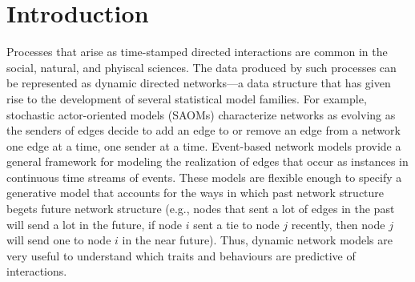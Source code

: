 \documentclass[ba]{imsart}
\numberwithin{equation}{section}
\theoremstyle{plain}
\begin{document}
\section{Introduction}\label{sec:introduction}

Processes that arise as time-stamped directed interactions are common in the social, natural, and phyiscal sciences. The data produced by such processes can be represented as dynamic directed networks---a data structure that has given rise to the development of several statistical model families. For example, stochastic actor-oriented models (SAOMs) \citep{snijders1996stochastic,snijders2007modeling} characterize networks as evolving as the senders of edges decide to add an edge to or remove an edge from a network one edge at a time, one sender at a time. Event-based network models \citep{Butts2008,Vu2011,hunter2011dynamic,PerryWolfe2012} provide a general framework for modeling the realization of edges that occur as instances in continuous time streams of events. These models are flexible enough to specify a generative model that accounts for the ways in which past network structure begets future network structure (e.g., nodes that sent a lot of edges in the past will send a lot in the future, if node $i$ sent a tie to node $j$ recently, then node $j$ will send one to node $i$ in the near future). Thus, dynamic network models are very useful to understand which traits and behaviours are predictive of interactions. 
\end{document}

